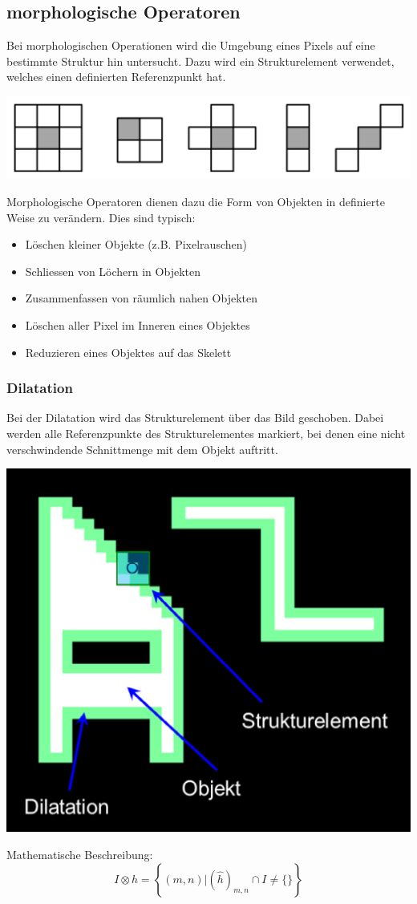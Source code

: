 \subsection{morphologische Operatoren}
Bei morphologischen Operationen wird die Umgebung eines Pixels auf eine bestimmte Struktur hin untersucht.
Dazu wird ein Strukturelement verwendet, welches einen definierten Referenzpunkt hat.
\begin{center}
	\includegraphics[scale=0.5]{./images/structelem.png}
\end{center}
Morphologische Operatoren dienen dazu die Form von Objekten in definierte Weise zu verändern. 
Dies sind typisch:
\begin{itemize}
	\item Löschen kleiner Objekte (z.B. Pixelrauschen) 
	\item Schliessen von Löchern in Objekten
	\item Zusammenfassen von räumlich nahen Objekten
	\item Löschen aller Pixel im Inneren eines Objektes
	\item Reduzieren eines Objektes auf das Skelett
\end{itemize}

\subsubsection{Dilatation}
Bei der Dilatation wird das Strukturelement über das Bild geschoben.
Dabei werden alle Referenzpunkte des Strukturelementes markiert, bei denen eine nicht verschwindende Schnittmenge mit dem Objekt auftritt.
\begin{center}
	\includegraphics[scale=0.5]{./images/dilatation.png}
\end{center}
Mathematische Beschreibung:
\[
	I \otimes h = \left\lbrace (m,n) | (\hat{h})_{m,n} \cap I \neq \{\} \right\rbrace
\]

